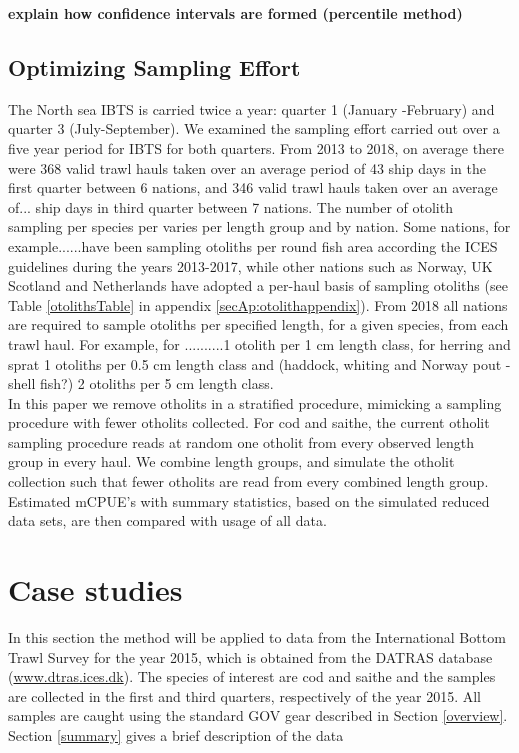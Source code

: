 \documentclass[a4paper 12pt]{article}
\numberwithin{equation}{section}
\begin{document}
{\bf explain how confidence intervals are formed (percentile method)}

\subsection{Optimizing Sampling Effort}
\label{sec:optimizationsampling}

The North sea IBTS is carried twice a year: quarter 1 (January -February) and quarter 3 (July-September). We examined the sampling effort carried out over a five year period for IBTS for both quarters. From 2013 to 2018, on average there were 368 valid trawl hauls taken over an average period of 43 ship days in the first quarter between 6 nations, and 346 valid trawl hauls taken over an average of... ship days in third quarter between 7 nations. The number of otolith sampling per species per varies per length group and by nation. Some nations, for example......have been sampling otoliths per round fish area according the ICES guidelines \citep{ICES2006} during the years 2013-2017, while other nations such as Norway, UK Scotland and Netherlands have adopted a per-haul basis of sampling otoliths (see Table \ref{otolithsTable} in appendix \ref{secAp:otolithappendix}). From 2018 all nations are required to sample otoliths per specified length, for a given species, from each trawl haul. For example, for ..........1 otolith per 1 cm length class, for herring and sprat 1 otoliths per 0.5 cm length class and (haddock, whiting and Norway pout - shell fish?) 2 otoliths per 5 cm length class.  \\

In this paper we remove otholits in a stratified procedure, mimicking a sampling procedure with fewer otholits collected. For cod and saithe, the current otholit sampling procedure reads at random one otholit from every observed length group in every haul. We combine length groups, and simulate the otholit collection such that fewer otholits are read from every combined length group. Estimated mCPUE's with summary statistics, based on the simulated reduced data sets, are then compared with usage of all data.


\section{Case studies}
\label{sec:data}
In this section the method will be applied to data from the International Bottom Trawl Survey for the year 2015, which is obtained from the DATRAS database (\url{www.dtras.ices.dk}). The species of interest are cod and saithe and the samples are collected in the first and third quarters, respectively of the year 2015. All samples are caught using the standard GOV gear described in Section \ref{overview}. Section \ref{summary} gives a brief description of the data \\
\end{document}
